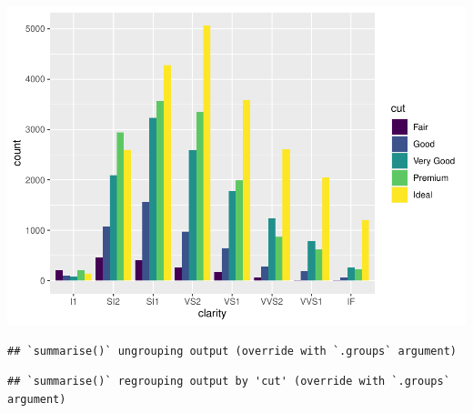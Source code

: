 \documentclass[
]{book}
\newenvironment{Shaded}{\begin{snugshade}}{\end{snugshade}}
\newcommand{\CommentTok}[1]{\textcolor[rgb]{0.56,0.35,0.01}{\textit{#1}}}
\newcommand{\DataTypeTok}[1]{\textcolor[rgb]{0.13,0.29,0.53}{#1}}
\newcommand{\KeywordTok}[1]{\textcolor[rgb]{0.13,0.29,0.53}{\textbf{#1}}}
\newcommand{\NormalTok}[1]{#1}
\newcommand{\OperatorTok}[1]{\textcolor[rgb]{0.81,0.36,0.00}{\textbf{#1}}}
\newcommand{\StringTok}[1]{\textcolor[rgb]{0.31,0.60,0.02}{#1}}
\begin{document}
\includegraphics{_main_files/figure-latex/unnamed-chunk-319-7.pdf}

\begin{Shaded}
\end{Shaded}

\begin{verbatim}
## `summarise()` ungrouping output (override with `.groups` argument)
\end{verbatim}

\begin{Shaded}
\end{Shaded}

\begin{verbatim}
## `summarise()` regrouping output by 'cut' (override with `.groups` argument)
\end{verbatim}
\end{document}
